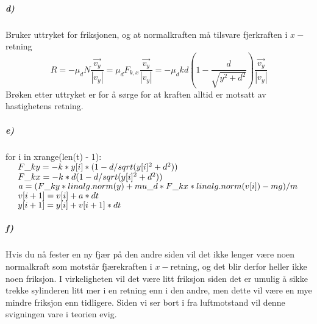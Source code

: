 \documentclass[11pt, A4paper,norsk]{article}
\begin{document}
			\subparagraph{d)}
				\begin{flushleft}
Bruker uttryket for friksjonen, og at normalkraften må tilsvare fjerkraften i $x-$retning
$$R = - \mu_d N \frac{\vec{v_y}}{|v_y|} = \mu_d F_{k,x} \frac{\vec{v_y}}{|v_y|} = - \mu_d kd \left( 1 - \frac{d}{\sqrt{y^2 + d^2}} \right) \frac{\vec{v_y}}{|v_y|}$$
Brøken etter uttryket er for å sørge for at kraften alltid er motsatt av hastighetens retning.
				\end{flushleft}









			\subparagraph{e)}
				\begin{flushleft}
for i in xrange(len(t) - 1): \\
$\hspace{5mm} F\_ky = - k * y[i] * ( 1 - d / sqrt(y[i]^2 + d^2))$ \\
$\hspace{5mm} F\_kx = - k * d ( 1 - d / sqrt(y[i]^2 + d^2))$ \\
$\hspace{5mm} a = (F\_ky * linalg.norm(y) + mu\_d * F\_kx * linalg.norm(v[i]) - mg) / m$ \\
$\hspace{5mm} v[i + 1] = v[i] + a * dt$ \\
$\hspace{5mm} y[i + 1] = y[i] + v[i + 1] * dt$ \\
				\end{flushleft}









			\subparagraph{f)}
				\begin{flushleft}
Hvis du nå fester en ny fjær på den andre siden vil det ikke lenger være noen normalkraft som motstår fjærekraften i $x-$retning, og det blir derfor heller ikke noen friksjon. I virkeligheten vil det være litt friksjon siden det er umulig å sikke trekke sylinderen litt mer i en retning enn i den andre, men dette vil være en mye mindre friksjon enn tidligere. Siden vi ser bort i fra luftmotstand vil denne svigningen vare i teorien evig.
				\end{flushleft}
\end{document}
